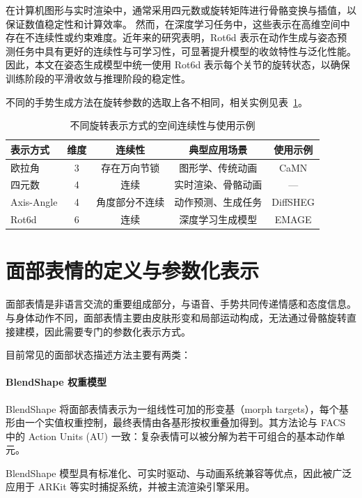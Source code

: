 在计算机图形与实时渲染中，通常采用四元数或旋转矩阵进行骨骼变换与插值，以保证数值稳定性和计算效率。
然而，在深度学习任务中，这些表示在高维空间中存在不连续性或约束难度。近年来的研究表明\cite{rot6d}，Rot6d 表示在动作生成与姿态预测任务中具有更好的连续性与可学习性，可显著提升模型的收敛特性与泛化性能。
因此，本文在姿态生成模型中统一使用 Rot6d 表示每个关节的旋转状态，以确保训练阶段的平滑收敛与推理阶段的稳定性。

不同的手势生成方法在旋转参数的选取上各不相同，相关实例见表~\ref{fig:rotation_comparison}。

\begin{table}[htbp]
\centering
\caption{不同旋转表示方式的空间连续性与使用示例}
\label{fig:rotation_comparison}
\begin{tabular}{@{}lcccc@{}}
\toprule
\textbf{表示方式} & \textbf{维度} & \textbf{连续性} & \textbf{典型应用场景} & \textbf{使用示例} \\ \midrule
欧拉角 & 3 & 存在万向节锁 & 图形学、传统动画 & CaMN\cite{beatcamn} \\
四元数 & 4 & 连续 & 实时渲染、骨骼动画 & — \\
Axis-Angle & 4 & 角度部分不连续 & 动作预测、生成任务 & DiffSHEG\cite{diffsheg} \\
Rot6d & 6 & 连续 & 深度学习生成模型 & EMAGE\cite{emage} \\ \bottomrule
\end{tabular}
\end{table}

\section{面部表情的定义与参数化表示}

面部表情是非语言交流的重要组成部分，与语音、手势共同传递情感和态度信息。与身体动作不同，面部表情主要由皮肤形变和局部运动构成，无法通过骨骼旋转直接建模，因此需要专门的参数化表示方式。

目前常见的面部状态描述方法主要有两类：

\paragraph{BlendShape 权重模型}
BlendShape 将面部表情表示为一组线性可加的形变基（morph targets），每个基形由一个实值权重控制，最终表情由各基形按权重叠加得到。其方法论与 FACS 中的 Action Units (AU) 一致：复杂表情可以被分解为若干可组合的基本动作单元。

BlendShape 模型具有标准化、可实时驱动、与动画系统兼容等优点，因此被广泛应用于 ARKit \cite{ARKitDocumentation} 等实时捕捉系统，并被主流渲染引擎采用。


